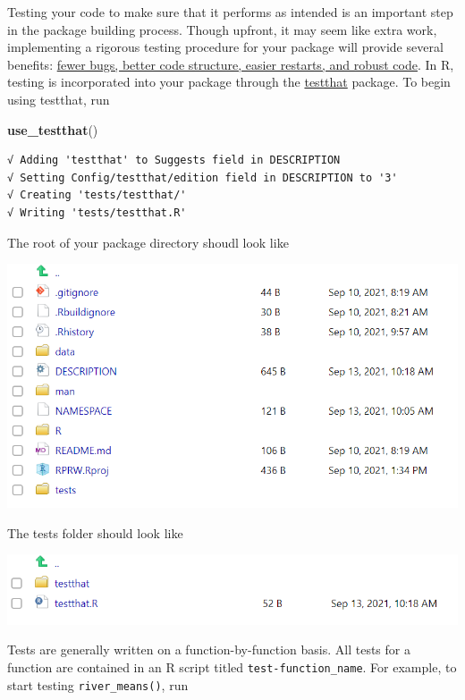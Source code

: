 \documentclass[
]{book}
\newenvironment{Shaded}{\begin{snugshade}}{\end{snugshade}}
\newcommand{\KeywordTok}[1]{\textcolor[rgb]{0.13,0.29,0.53}{\textbf{#1}}}
\newcommand{\NormalTok}[1]{#1}
\begin{document}
Testing your code to make sure that it performs as intended is an important step in the package building process. Though upfront, it may seem like extra work, implementing a rigorous testing procedure for your package will provide several benefits: \href{https://r-pkgs.org/tests.html}{fewer bugs, better code structure, easier restarts, and robust code}. In R, testing is incorporated into your package through the \href{https://testthat.r-lib.org/}{testthat} package. To begin using testthat, run

\begin{Shaded}
\begin{Highlighting}[]
\KeywordTok{use_testthat}\NormalTok{()}
\end{Highlighting}
\end{Shaded}

\begin{verbatim}
√ Adding 'testthat' to Suggests field in DESCRIPTION
√ Setting Config/testthat/edition field in DESCRIPTION to '3'
√ Creating 'tests/testthat/'
√ Writing 'tests/testthat.R'
\end{verbatim}

The root of your package directory shoudl look like

\includegraphics[width=1\linewidth]{images/newrpack_files3}

The tests folder should look like

\includegraphics[width=1\linewidth]{images/newrpack_files4}

Tests are generally written on a function-by-function basis. All tests for a function are contained in an R script titled \texttt{test-function\_name}. For example, to start testing \texttt{river\_means()}, run
\end{document}
